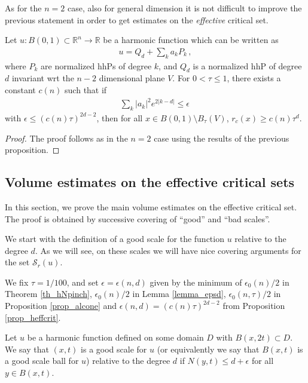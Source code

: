 \documentclass[11pt]{article}
\begin{document}
As for the $n=2$ case, also for general dimension it is not difficult to improve the previous statement in order to get estimates on the \textit{effective} critical set.

\begin{proposition}\label{prop_heffcrit}
  Let $u:B(0,1)\subset {\mathbb{R}}^n\to {\mathbb{R}}$ be a harmonic function which can be written as
 \begin{gather}
  u=Q_d + \sum_k a_k P_k\, ,
 \end{gather}
where $P_k$ are normalized hhPs of degree $k$, and $Q_d$ is a normalized hhP of degree $d$ invariant wrt the $n-2$ dimensional plane $V$. For $0<\tau\leq 1$, there exists a constant $c(n)$ such that if
\begin{gather}
 \sum_k {\left|{a_k}\right|}^2 e^{2{\left|{k-d}\right|}}\leq \epsilon\, 
\end{gather}
with $\epsilon \leq (c(n)\tau )^{2d-2}$, then for all $x\in B(0,1)\setminus B_\tau(V)$, $r_c(x)\geq c(n) \tau^{d}$. 
\end{proposition}
\begin{proof}
The proof follows as in the $n=2$ case using the results of the previous proposition.
\end{proof}

\subsection{Volume estimates on the effective critical sets}\label{ss:volume_estimates_harmonic}
In this section, we prove the main volume estimates on the effective critical set. The proof is obtained by successive covering of ``good'' and ``bad scales''.

We start with the definition of a good scale for the function $u$ relative to the degree $d$. As we will see, on these scales we will have nice covering arguments for the set ${\mathcal{S}}_r(u)$. 

We fix $\tau=1/100$, and set $\epsilon=\epsilon(n,d)$ given by the minimum of $\epsilon_0(n)/2$ in Theorem \ref{th_hNpinch}, $\epsilon_0(n)/2$ in Lemma \ref{lemma_epsd}, $\epsilon_0(n,\tau)/2$ in Proposition \ref{prop_alcone} and $\epsilon(n,d)=(c(n)\tau)^{2d-2}$
from Proposition \ref{prop_heffcrit}.

\begin{definition}
 Let $u$ be a harmonic function defined on some domain $D$ with $B(x,2t)\subset D$. We say that $(x,t)$ is a good scale for $u$ (or equivalently we say that $B(x,t)$ is a good scale ball for $u$) relative to the degree $d$ if $N(y,t)\leq d+\epsilon$ for all $y\in B(x,t)$.
\end{definition}
\end{document}
